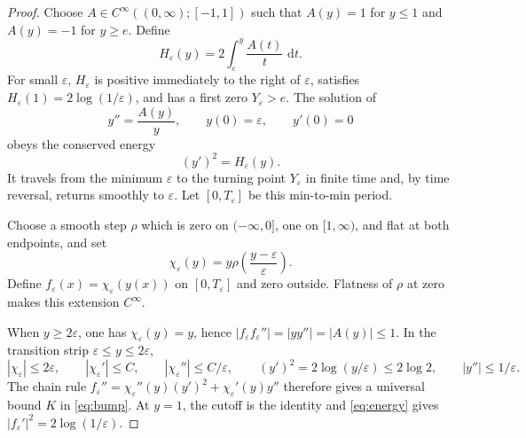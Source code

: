 \documentclass[11pt]{article}
\newcommand{\dd}{\,\mathrm d}
\begin{document}
\begin{proof}
Choose $A\in C^\infty((0,\infty);[-1,1])$ such that $A(y)=1$ for $y\le1$
and $A(y)=-1$ for $y\ge e$.  Define
\[
 H_\varepsilon(y)=2\int_\varepsilon^y\frac{A(t)}t\,\dd t.
\]
For small $\varepsilon$, $H_\varepsilon$ is positive immediately to the
right of $\varepsilon$, satisfies
$H_\varepsilon(1)=2\log(1/\varepsilon)$, and has a first zero
$Y_\varepsilon>e$.  The solution of
\begin{equation}\label{eq:ode}
 y''=\frac{A(y)}y,\qquad y(0)=\varepsilon,\qquad y'(0)=0
\end{equation}
obeys the conserved energy
\begin{equation}\label{eq:energy}
 (y')^2=H_\varepsilon(y).
\end{equation}
It travels from the minimum $\varepsilon$ to the turning point
$Y_\varepsilon$ in finite time and, by time reversal, returns smoothly to
$\varepsilon$.  Let $[0,T_\varepsilon]$ be this min-to-min period.

Choose a smooth step $\rho$ which is zero on $(-\infty,0]$, one on
$[1,\infty)$, and flat at both endpoints, and set
\[
 \chi_\varepsilon(y)=y\rho\left(\frac{y-\varepsilon}{\varepsilon}\right).
\]
Define $f_\varepsilon(x)=\chi_\varepsilon(y(x))$ on
$[0,T_\varepsilon]$ and zero outside.  Flatness of $\rho$ at zero makes this
extension $C^\infty$.

When $y\ge2\varepsilon$, one has $\chi_\varepsilon(y)=y$, hence
$|f_\varepsilon f_\varepsilon''|=|yy''|=|A(y)|\le1$.  In the transition
strip $\varepsilon\le y\le2\varepsilon$,
\[
 |\chi_\varepsilon|\le2\varepsilon,\qquad
 |\chi_\varepsilon'|\le C,\qquad
 |\chi_\varepsilon''|\le C/\varepsilon,\qquad
 (y')^2=2\log(y/\varepsilon)\le2\log2,\qquad
 |y''|\le1/\varepsilon.
\]
The chain rule
$f_\varepsilon''=\chi_\varepsilon''(y)(y')^2+\chi_\varepsilon'(y)y''$
therefore gives a universal bound $K$ in \eqref{eq:bump}.  At $y=1$, the
cutoff is the identity and \eqref{eq:energy} gives
$|f_\varepsilon'|^2=2\log(1/\varepsilon)$.
\end{proof}
\end{document}
